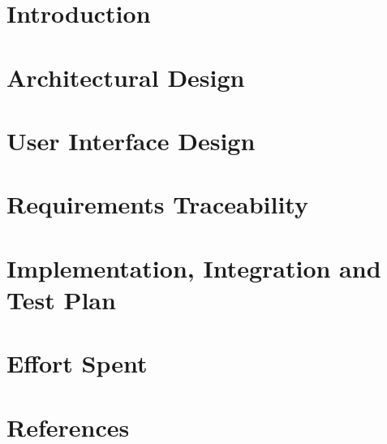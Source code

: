 \documentclass{Config/PoliMi3i_thesis}
\begin{document}

    \pagestyle{empty} %
    \frontmatter %


    \startpreamble
    \setcounter{page}{1}

    \thispagestyle{empty}
    \tableofcontents %
    \thispagestyle{empty}
    \cleardoublepage

    \mainmatter %

    \chapter{Introduction}\label{ch:introduction}
    
    
    \chapter{Architectural Design}\label{ch:architectural-design}
    

    \chapter{User Interface Design}\label{ch:user-interface-design}
    

    \chapter{Requirements Traceability}\label{ch:requirements-traceability}
    

    \chapter{Implementation, Integration and Test Plan}\label{ch:implementation-inegration-and-test-plan}
    

    \chapter{Effort Spent}\label{ch:effort-spent}
    

    \chapter{References}\label{ch:references}
    

    \listoffigures

    \listoftables

    \cleardoublepage
\end{document}
